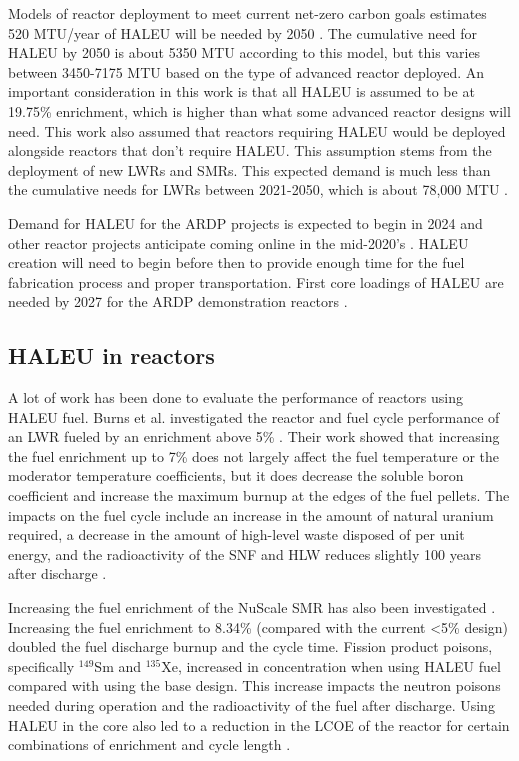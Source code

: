 Models of reactor deployment to meet current net-zero carbon goals 
estimates 520 MTU/year of \gls{HALEU} will be needed by 2050 
\cite{dixon_estimated_2022}. The cumulative need for \gls{HALEU} by 2050 
is about 5350 MTU according to this model, but this varies between 
3450-7175 MTU based on the type of advanced reactor deployed. An important 
consideration in this work is that all \gls{HALEU} is assumed to be 
at 19.75\% enrichment, which is higher than what some advanced reactor 
designs will need. This work also assumed that reactors 
requiring \gls{HALEU} would be deployed alongside reactors that don't 
require \gls{HALEU}. This assumption stems from the deployment of new 
\glspl{LWR} and \glspl{SMR}. This expected demand is much less than the 
cumulative needs for \glspl{LWR} between 2021-2050, which 
is about 78,000 MTU \cite{dixon_estimated_2022}. 

Demand for \gls{HALEU} for the \gls{ARDP} projects is expected to begin in 
2024 and other reactor projects anticipate coming online in the 
mid-2020's \cite{nuclear_energy_institute_establishing_2022}. 
\gls{HALEU} creation will need to begin before then to provide enough 
time for the fuel fabrication process and proper transportation. First 
core loadings of \gls{HALEU} are needed by 2027 for the \gls{ARDP} 
demonstration reactors \cite{dixon_estimated_2022}. 

\subsection{HALEU in reactors}
A lot of work has been done to evaluate the performance of reactors 
using \gls{HALEU} fuel. Burns et al. investigated the reactor and fuel cycle 
performance of an \gls{LWR} fueled by an enrichment above 5\% \cite{burns_reactor_2020}.
Their work showed that increasing the fuel enrichment up to 7\% does not 
largely affect the fuel temperature or the moderator temperature coefficients,
but it does decrease the soluble boron coefficient and increase the maximum 
burnup at the edges of the fuel pellets. The impacts on the fuel cycle include 
an increase in the amount of natural uranium required, a decrease in the 
amount of high-level waste disposed of per unit energy, and the 
radioactivity of the \gls{SNF} and \gls{HLW} reduces slightly 100 years 
after discharge \cite{burns_reactor_2020}.

Increasing the fuel enrichment of the NuScale \gls{SMR} has also been 
investigated \cite{carlson_implications_2022}. Increasing the fuel 
enrichment to 8.34\% (compared with the current <5\% design) doubled 
the fuel discharge burnup and the cycle time. 
Fission product poisons, specifically $^{149}$Sm and $^{135}$Xe, increased 
in concentration when using \gls{HALEU} fuel compared with using the base 
design. This increase impacts the 
neutron poisons needed during operation and the radioactivity of 
the fuel after discharge. Using \gls{HALEU} in the core also led to a 
reduction in the \gls{LCOE} of the reactor for certain combinations of 
enrichment and cycle length \cite{carlson_economic_2020,carlson_implications_2022}.

